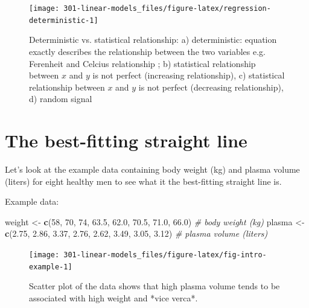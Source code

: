 \documentclass[
]{book}
\newenvironment{Shaded}{\begin{snugshade}}{\end{snugshade}}
\newcommand{\CommentTok}[1]{\textcolor[rgb]{0.56,0.35,0.01}{\textit{#1}}}
\newcommand{\DecValTok}[1]{\textcolor[rgb]{0.00,0.00,0.81}{#1}}
\newcommand{\FloatTok}[1]{\textcolor[rgb]{0.00,0.00,0.81}{#1}}
\newcommand{\KeywordTok}[1]{\textcolor[rgb]{0.13,0.29,0.53}{\textbf{#1}}}
\newcommand{\NormalTok}[1]{#1}
\newcommand{\StringTok}[1]{\textcolor[rgb]{0.31,0.60,0.02}{#1}}
\theoremstyle{definition}
\theoremstyle{definition}
\theoremstyle{definition}
\theoremstyle{remark}
\begin{document}
\begin{figure}

{\centering \texttt{[image: 301-linear-models\_files/figure-latex/regression-deterministic-1]} 

}

\caption{Deterministic vs. statistical relationship: a) deterministic: equation exactly describes the relationship between the two variables e.g. Ferenheit and Celcius relationship ; b) statistical relationship between $x$ and $y$ is not perfect (increasing relationship), c)  statistical relationship between $x$ and $y$ is not perfect (decreasing relationship), d) random signal}\label{fig:regression-deterministic}
\end{figure}

\hypertarget{the-best-fitting-straight-line}{%
\section{The best-fitting straight line}\label{the-best-fitting-straight-line}}

Let's look at the example data containing body weight (kg) and plasma volume (liters) for eight healthy men to see what it the best-fitting straight line is.

Example data:

\begin{Shaded}
\begin{Highlighting}[]
\NormalTok{weight \textless{}{-}}\StringTok{ }\KeywordTok{c}\NormalTok{(}\DecValTok{58}\NormalTok{, }\DecValTok{70}\NormalTok{, }\DecValTok{74}\NormalTok{, }\FloatTok{63.5}\NormalTok{, }\FloatTok{62.0}\NormalTok{, }\FloatTok{70.5}\NormalTok{, }\FloatTok{71.0}\NormalTok{, }\FloatTok{66.0}\NormalTok{) }\CommentTok{\# body weight (kg)}
\NormalTok{plasma \textless{}{-}}\StringTok{ }\KeywordTok{c}\NormalTok{(}\FloatTok{2.75}\NormalTok{, }\FloatTok{2.86}\NormalTok{, }\FloatTok{3.37}\NormalTok{, }\FloatTok{2.76}\NormalTok{, }\FloatTok{2.62}\NormalTok{, }\FloatTok{3.49}\NormalTok{, }\FloatTok{3.05}\NormalTok{, }\FloatTok{3.12}\NormalTok{) }\CommentTok{\# plasma volume (liters)}
\end{Highlighting}
\end{Shaded}

\begin{figure}

{\centering \texttt{[image: 301-linear-models\_files/figure-latex/fig-intro-example-1]} 

}

\caption{Scatter plot of the data shows that high plasma volume tends to be associated with high weight and *vice verca*.}\label{fig:fig-intro-example}
\end{figure}
\end{document}
